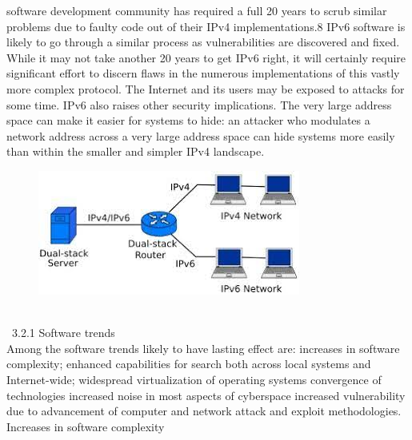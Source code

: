 \documentclass[11pt,a4paper]{article}
\begin{document}
software development community has required a full 20 years to scrub similar problems due to faulty code out of their IPv4 implementations.8 IPv6 software is likely to go through a similar process as vulnerabilities are discovered and fixed. While it may not take another 20 years to get IPv6 right, it will certainly require significant effort to discern flaws in the numerous implementations of this vastly more complex protocol. The Internet and its users may be exposed to attacks for some time. IPv6 also raises other security implications.
The very large address space can make it easier for systems to hide: an attacker who modulates a network address across a very large address space can hide
systems more easily than within the smaller and simpler IPv4 landscape.\\
\begin{center}
\begin{figure}[h]
			\centering
			\includegraphics[width=10 cm]{ipv4.jpeg}
\end{figure}
\end{center}\\
\	3.2.1 Software trends\\
 	
 	Among the software trends likely to have
lasting effect are: increases in software complexity; enhanced capabilities for search both across local systems and Internet-wide; widespread virtualization of
operating systems convergence of technologies increased noise in most aspects of cyberspace increased vulnerability due to advancement of computer and network attack and exploit methodologies.\\

 Increases in software complexity\\
 
\end{document}
